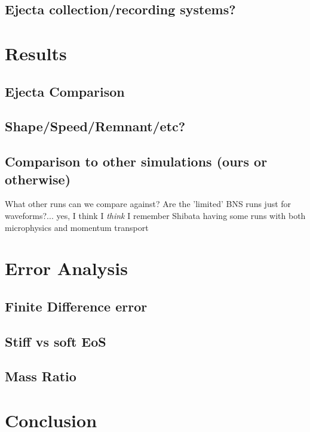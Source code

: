 \documentclass[%
twocolumn,
superscriptaddress,
nofootinbib,
 amsmath,amssymb,
 aps, prd
]{revtex4-2}
\begin{document}
  \subsection{Ejecta collection/recording systems?}

\section{Results}
  \subsection{Ejecta Comparison}
  \subsection{Shape/Speed/Remnant/etc?}
  \subsection{Comparison to other simulations (ours or otherwise)}
      What other runs can we compare against? Are the 'limited' BNS runs just for waveforms?... yes, I think
      I \textit{think} I remember Shibata having some runs with both microphysics and momentum transport

\section{Error Analysis}
  \subsection{Finite Difference error}
  \subsection{Stiff vs soft EoS}
  \subsection{Mass Ratio}

\section{Conclusion}




\end{document}
